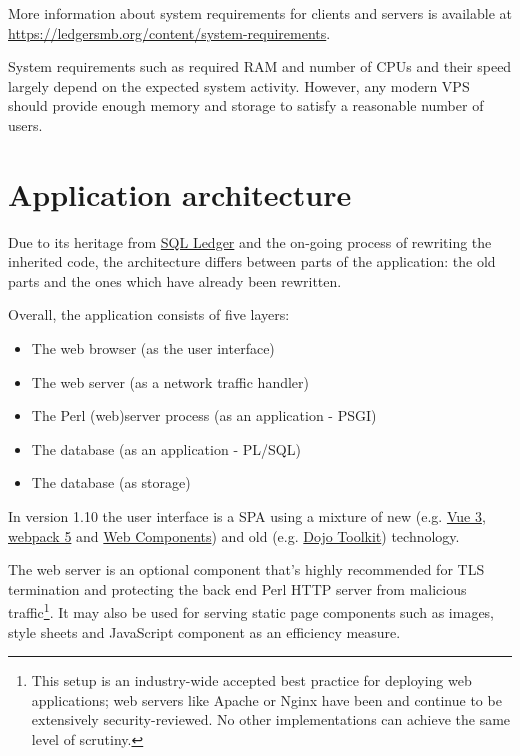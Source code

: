 More information about system requirements for clients and servers is available at
\href{https://ledgersmb.org/content/system-requirements}{https://ledgersmb.org/content/system-requirements}.

System requirements such as required RAM and number of CPUs and their speed
largely depend on the expected system activity. However, any modern \acrshort{VPS} should provide enough memory and storage to satisfy a reasonable number of users.

\section{Application architecture}
\label{sec-ledgersmb-architecture}

Due to its heritage from \href{https://sql-ledger.com/}{SQL Ledger} and the on-going process of rewriting
the inherited code, the architecture differs between parts
of the application: the old parts and the ones which have already been
rewritten.

Overall, the application consists of five layers:

\begin{itemize}
\item The web browser (as the user interface)
\item The web server (as a network traffic handler)
\item The Perl (web)server process (as an application - \gls{PSGI})
\item The database (as an application - \gls{PL/SQL})
\item The database (as storage)
\end{itemize}

In version 1.10 the user interface is a \gls{SPA} using a mixture of new (e.g. 
\href{https://vuejs.org/}{Vue 3},
\href{https://webpack.js.org/}{webpack 5} and \href{https://developer.mozilla.org/en-US/docs/Web/Web_Components}{Web Components}) and old (e.g. \href{https://dojotoolkit.org/}{Dojo Toolkit}) technology.

The web server is an optional component that's highly recommended for TLS termination
and protecting the back end Perl HTTP server from malicious traffic\footnote{This setup is an industry-wide accepted best practice for deploying web applications; web servers like Apache or Nginx have been and continue to be extensively security-reviewed. No other implementations can achieve the same level of scrutiny.}. It may also be used
for serving static page components such as images, style sheets and JavaScript component as an efficiency measure.

